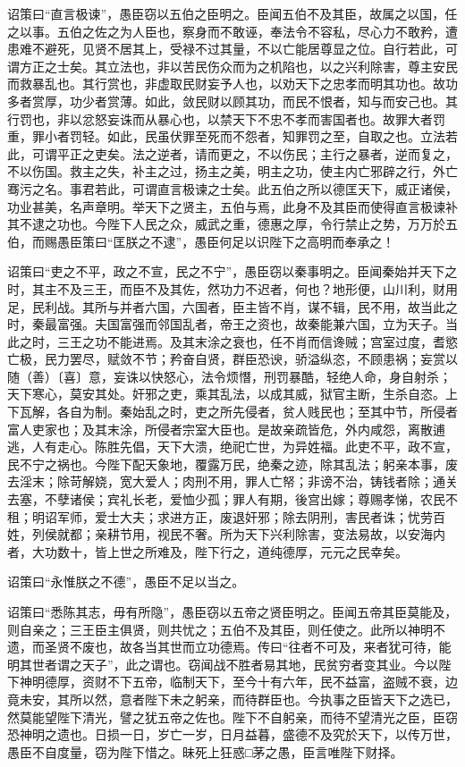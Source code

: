 \documentclass[UTF8,titlepage,oneside]{ctexbook}
\begin{document}
诏策曰“直言极谏”，愚臣窃以五伯之臣明之。臣闻五伯不及其臣，故属之以国，任之以事。五伯之佐之为人臣也，察身而不敢诬，奉法令不容私，尽心力不敢矜，遭患难不避死，见贤不居其上，受禄不过其量，不以亡能居尊显之位。自行若此，可谓方正之士矣。其立法也，非以苦民伤众而为之机陷也，以之兴利除害，尊主安民而救暴乱也。其行赏也，非虚取民财妄予人也，以劝天下之忠孝而明其功也。故功多者赏厚，功少者赏薄。如此，敛民财以顾其功，而民不恨者，知与而安己也。其行罚也，非以忿怒妄诛而从暴心也，以禁天下不忠不孝而害国者也。故罪大者罚重，罪小者罚轻。如此，民虽伏罪至死而不怨者，知罪罚之至，自取之也。立法若此，可谓平正之吏矣。法之逆者，请而更之，不以伤民；主行之暴者，逆而复之，不以伤国。救主之失，补主之过，扬主之美，明主之功，使主内亡邪辟之行，外亡骞污之名。事君若此，可谓直言极谏之士矣。此五伯之所以德匡天下，威正诸侯，功业甚美，名声章明。举天下之贤主，五伯与焉，此身不及其臣而使得直言极谏补其不逮之功也。今陛下人民之众，威武之重，德惠之厚，令行禁止之势，万万於五伯，而赐愚臣策曰“匡朕之不逮”，愚臣何足以识陛下之高明而奉承之！

诏策曰“吏之不平，政之不宣，民之不宁”，愚臣窃以秦事明之。臣闻秦始并天下之时，其主不及三王，而臣不及其佐，然功力不迟者，何也？地形便，山川利，财用足，民利战。其所与并者六国，六国者，臣主皆不肖，谋不辑，民不用，故当此之时，秦最富强。夫国富强而邻国乱者，帝王之资也，故秦能兼六国，立为天子。当此之时，三王之功不能进焉。及其末涂之衰也，任不肖而信谗贼；宫室过度，耆慾亡极，民力罢尽，赋敛不节；矜奋自贤，群臣恐谀，骄溢纵恣，不顾患祸；妄赏以随（善）〔喜〕意，妄诛以快怒心，法令烦憯，刑罚暴酷，轻绝人命，身自射杀；天下寒心，莫安其处。奸邪之吏，乘其乱法，以成其威，狱官主断，生杀自恣。上下瓦解，各自为制。秦始乱之时，吏之所先侵者，贫人贱民也；至其中节，所侵者富人吏家也；及其末涂，所侵者宗室大臣也。是故亲疏皆危，外内咸怨，离散逋逃，人有走心。陈胜先倡，天下大溃，绝祀亡世，为异姓福。此吏不平，政不宣，民不宁之祸也。今陛下配天象地，覆露万民，绝秦之迹，除其乱法；躬亲本事，废去淫末；除苛解娆，宽大爱人；肉刑不用，罪人亡帑；非谤不治，铸钱者除；通关去塞，不孽诸侯；宾礼长老，爱恤少孤；罪人有期，後宫出嫁；尊赐孝悌，农民不租；明诏军师，爱士大夫；求进方正，废退奸邪；除去阴刑，害民者诛；忧劳百姓，列侯就都；亲耕节用，视民不奢。所为天下兴利除害，变法易故，以安海内者，大功数十，皆上世之所难及，陛下行之，道纯德厚，元元之民幸矣。

诏策曰“永惟朕之不德”，愚臣不足以当之。

诏策曰“悉陈其志，毋有所隐”，愚臣窃以五帝之贤臣明之。臣闻五帝其臣莫能及，则自亲之；三王臣主俱贤，则共忧之；五伯不及其臣，则任使之。此所以神明不遗，而圣贤不废也，故各当其世而立功德焉。传曰“往者不可及，来者犹可待，能明其世者谓之天子”，此之谓也。窃闻战不胜者易其地，民贫穷者变其业。今以陛下神明德厚，资财不下五帝，临制天下，至今十有六年，民不益富，盗贼不衰，边竟未安，其所以然，意者陛下未之躬亲，而待群臣也。今执事之臣皆天下之选已，然莫能望陛下清光，譬之犹五帝之佐也。陛下不自躬亲，而待不望清光之臣，臣窃恐神明之遗也。日损一日，岁亡一岁，日月益暮，盛德不及究於天下，以传万世，愚臣不自度量，窃为陛下惜之。昧死上狂惑□茅之愚，臣言唯陛下财择。
\end{document}
